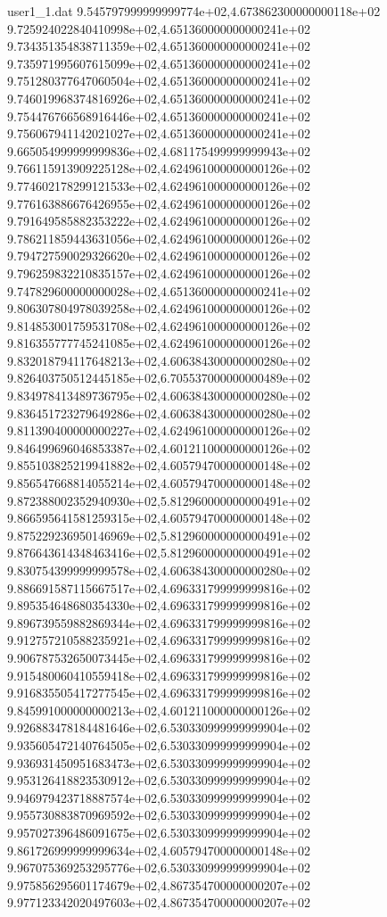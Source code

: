 \begin{filecontents}{user1_1.dat}
9.545797999999999774e+02,4.673862300000000118e+02
9.725924022840410998e+02,4.651360000000000241e+02
9.734351354838711359e+02,4.651360000000000241e+02
9.735971995607615099e+02,4.651360000000000241e+02
9.751280377647060504e+02,4.651360000000000241e+02
9.746019968374816926e+02,4.651360000000000241e+02
9.754476766568916446e+02,4.651360000000000241e+02
9.756067941142021027e+02,4.651360000000000241e+02
9.665054999999999836e+02,4.681175499999999943e+02
9.766115913909225128e+02,4.624961000000000126e+02
9.774602178299121533e+02,4.624961000000000126e+02
9.776163886676426955e+02,4.624961000000000126e+02
9.791649585882353222e+02,4.624961000000000126e+02
9.786211859443631056e+02,4.624961000000000126e+02
9.794727590029326620e+02,4.624961000000000126e+02
9.796259832210835157e+02,4.624961000000000126e+02
9.747829600000000028e+02,4.651360000000000241e+02
9.806307804978039258e+02,4.624961000000000126e+02
9.814853001759531708e+02,4.624961000000000126e+02
9.816355777745241085e+02,4.624961000000000126e+02
9.832018794117648213e+02,4.606384300000000280e+02
9.826403750512445185e+02,6.705537000000000489e+02
9.834978413489736795e+02,4.606384300000000280e+02
9.836451723279649286e+02,4.606384300000000280e+02
9.811390400000000227e+02,4.624961000000000126e+02
9.846499696046853387e+02,4.601211000000000126e+02
9.855103825219941882e+02,4.605794700000000148e+02
9.856547668814055214e+02,4.605794700000000148e+02
9.872388002352940930e+02,5.812960000000000491e+02
9.866595641581259315e+02,4.605794700000000148e+02
9.875229236950146969e+02,5.812960000000000491e+02
9.876643614348463416e+02,5.812960000000000491e+02
9.830754399999999578e+02,4.606384300000000280e+02
9.886691587115667517e+02,4.696331799999999816e+02
9.895354648680354330e+02,4.696331799999999816e+02
9.896739559882869344e+02,4.696331799999999816e+02
9.912757210588235921e+02,4.696331799999999816e+02
9.906787532650073445e+02,4.696331799999999816e+02
9.915480060410559418e+02,4.696331799999999816e+02
9.916835505417277545e+02,4.696331799999999816e+02
9.845991000000000213e+02,4.601211000000000126e+02
9.926883478184481646e+02,6.530330999999999904e+02
9.935605472140764505e+02,6.530330999999999904e+02
9.936931450951683473e+02,6.530330999999999904e+02
9.953126418823530912e+02,6.530330999999999904e+02
9.946979423718887574e+02,6.530330999999999904e+02
9.955730883870969592e+02,6.530330999999999904e+02
9.957027396486091675e+02,6.530330999999999904e+02
9.861726999999999634e+02,4.605794700000000148e+02
9.967075369253295776e+02,6.530330999999999904e+02
9.975856295601174679e+02,4.867354700000000207e+02
9.977123342020497603e+02,4.867354700000000207e+02

\end{filecontents}
